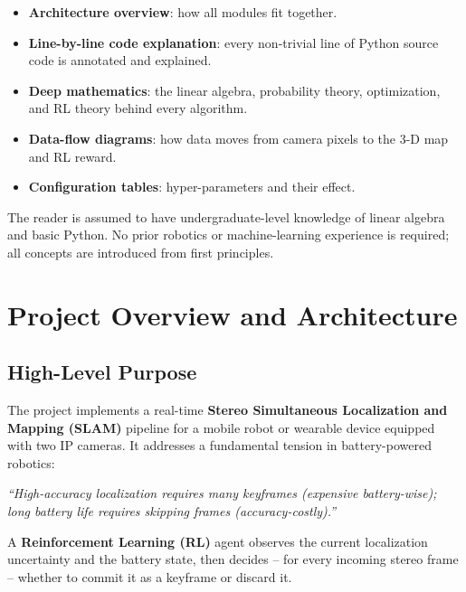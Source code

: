 \documentclass[12pt,a4paper,twoside]{report}
\theoremstyle{definition}
\begin{document}
\begin{itemize}[leftmargin=1.5em]
  \item \textbf{Architecture overview}: how all modules fit together.
  \item \textbf{Line-by-line code explanation}: every non-trivial line of Python
        source code is annotated and explained.
  \item \textbf{Deep mathematics}: the linear algebra, probability theory,
        optimization, and RL theory behind every algorithm.
  \item \textbf{Data-flow diagrams}: how data moves from camera pixels to the
        3-D map and RL reward.
  \item \textbf{Configuration tables}: hyper-parameters and their effect.
\end{itemize}

\noindent The reader is assumed to have undergraduate-level knowledge of linear
algebra and basic Python. No prior robotics or machine-learning experience is
required; all concepts are introduced from first principles.

\setcounter{page}{1}

\chapter{Project Overview and Architecture}

\section{High-Level Purpose}

The project implements a real-time \textbf{Stereo Simultaneous Localization and
Mapping (SLAM)} pipeline for a mobile robot or wearable device equipped with two
IP cameras. It addresses a fundamental tension in battery-powered robotics:

\begin{center}
\emph{``High-accuracy localization requires many keyframes (expensive battery-wise);\\
      long battery life requires skipping frames (accuracy-costly).''}
\end{center}

\noindent A \textbf{Reinforcement Learning (RL)} agent observes the current
localization uncertainty and the battery state, then decides -- for every
incoming stereo frame -- whether to commit it as a keyframe or discard it.
\end{document}
